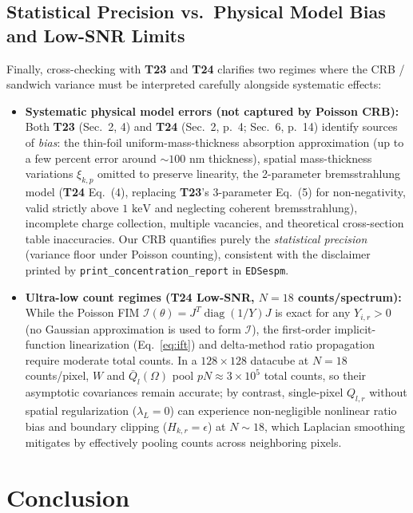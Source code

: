 \documentclass[11pt,a4paper]{article}
\theoremstyle{plain}
\theoremstyle{definition}
\theoremstyle{remark}
\newcommand{\cI}{\mathcal{I}}
\newcommand{\diag}{\operatorname{diag}}
\begin{document}
\subsection{Statistical Precision vs.\ Physical Model Bias and Low-SNR Limits}
Finally, cross-checking with \textbf{T23} and \textbf{T24} clarifies two regimes where the CRB / sandwich variance must be interpreted carefully alongside systematic effects:
\begin{itemize}[leftmargin=1.5em]
    \item \textbf{Systematic physical model errors (not captured by Poisson CRB):} Both \textbf{T23} (Sec.~2, 4) and \textbf{T24} (Sec.~2, p.~4; Sec.~6, p.~14) identify sources of \emph{bias}: the thin-foil uniform-mass-thickness absorption approximation (up to a few percent error around $\sim 100\text{ nm}$ thickness), spatial mass-thickness variations $\xi_{k,p}$ omitted to preserve linearity, the 2-parameter bremsstrahlung model (\textbf{T24} Eq.~(4), replacing \textbf{T23}'s 3-parameter Eq.~(5) for non-negativity, valid strictly above $1\text{ keV}$ and neglecting coherent bremsstrahlung), incomplete charge collection, multiple vacancies, and theoretical cross-section table inaccuracies. Our CRB quantifies purely the \emph{statistical precision} (variance floor under Poisson counting), consistent with the disclaimer printed by \texttt{print\_concentration\_report} in \texttt{EDSespm}.
    \item \textbf{Ultra-low count regimes (\textbf{T24} Low-SNR, $N = 18$ counts/spectrum):} While the Poisson FIM $\cI(\theta) = J^T \diag(1/Y) J$ is exact for any $Y_{i,r} > 0$ (no Gaussian approximation is used to form $\cI$), the first-order implicit-function linearization (Eq.~\eqref{eq:ift}) and delta-method ratio propagation require moderate total counts. In a $128 \times 128$ datacube at $N=18$ counts/pixel, $W$ and $\bar{Q}_l(\Omega)$ pool $p N \approx 3 \times 10^5$ total counts, so their asymptotic covariances remain accurate; by contrast, single-pixel $Q_{l,r}$ without spatial regularization ($\lambda_L = 0$) can experience non-negligible nonlinear ratio bias and boundary clipping ($H_{k,r} = \epsilon$) at $N \sim 18$, which Laplacian smoothing mitigates by effectively pooling counts across neighboring pixels.
\end{itemize}

\section{Conclusion}
\end{document}

